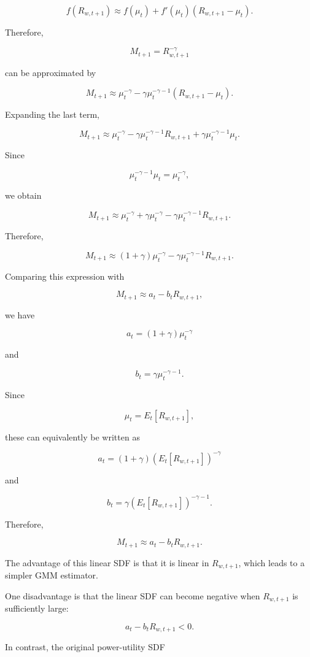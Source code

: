 \documentclass{article}
\begin{document}
\[
f(R_{w,t+1})
\approx
f(\mu_t)
+
f'(\mu_t)
\left(
R_{w,t+1}-\mu_t
\right).
\]

Therefore,

\[
M_{t+1}
=
R_{w,t+1}^{-\gamma}
\]

can be approximated by

\[
M_{t+1}
\approx
\mu_t^{-\gamma}
-
\gamma
\mu_t^{-\gamma-1}
\left(
R_{w,t+1}-\mu_t
\right).
\]

Expanding the last term,

\[
M_{t+1}
\approx
\mu_t^{-\gamma}
-
\gamma
\mu_t^{-\gamma-1}
R_{w,t+1}
+
\gamma
\mu_t^{-\gamma-1}\mu_t.
\]

Since

\[
\mu_t^{-\gamma-1}\mu_t
=
\mu_t^{-\gamma},
\]

we obtain

\[
M_{t+1}
\approx
\mu_t^{-\gamma}
+
\gamma\mu_t^{-\gamma}
-
\gamma\mu_t^{-\gamma-1}R_{w,t+1}.
\]

Therefore,

\[
M_{t+1}
\approx
(1+\gamma)\mu_t^{-\gamma}
-
\gamma\mu_t^{-\gamma-1}R_{w,t+1}.
\]

Comparing this expression with

\[
M_{t+1}
\approx
a_t-b_tR_{w,t+1},
\]

we have

\[
\boxed{
a_t
=
(1+\gamma)\mu_t^{-\gamma}
}
\]

and

\[
\boxed{
b_t
=
\gamma\mu_t^{-\gamma-1}.
}
\]

Since

\[
\mu_t
=
E_t[R_{w,t+1}],
\]

these can equivalently be written as

\[
\boxed{
a_t
=
(1+\gamma)
\left(
E_t[R_{w,t+1}]
\right)^{-\gamma}
}
\]

and

\[
\boxed{
b_t
=
\gamma
\left(
E_t[R_{w,t+1}]
\right)^{-\gamma-1}.
}
\]

Therefore,

\[
\boxed{
M_{t+1}
\approx
a_t-b_tR_{w,t+1}.
}
\]

The advantage of this linear SDF is that it is linear in \(R_{w,t+1}\), which leads to a simpler GMM estimator.

One disadvantage is that the linear SDF can become negative when \(R_{w,t+1}\) is sufficiently large:

\[
a_t-b_tR_{w,t+1}<0.
\]

In contrast, the original power-utility SDF
\end{document}
